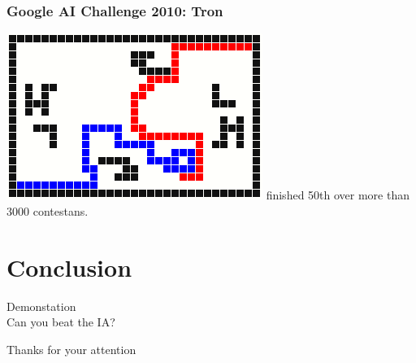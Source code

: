 \documentclass{beamer}
\begin{document}
\begin{frame}
\begin{center}
\frametitle{Google AI Challenge 2010: Tron}
\includegraphics[width=\linewidth]{tron}
finished 50th over more than 3000 contestans.
\end{center}
\end{frame}

\section{Conclusion}

\begin{frame}
\begin{center}
\Huge Demonstation \\ Can you beat the IA?
\end{center}
\end{frame}

\begin{frame}
\begin{center}
\Huge Thanks for your attention
\end{center}
\end{frame}
\end{document}
